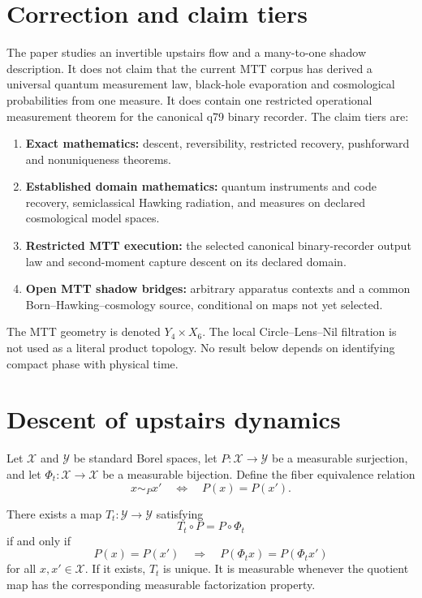 \documentclass[11pt]{article}
\newcommand{\cX}{\mathcal X}
\newcommand{\cY}{\mathcal Y}
\begin{document}
\tableofcontents

\section{Correction and claim tiers}

The paper studies an invertible upstairs flow and a many-to-one shadow description.
It does not claim that the current MTT corpus has derived a universal quantum
measurement law, black-hole evaporation and cosmological probabilities from one
measure. It does contain one restricted operational measurement theorem for the
canonical q79 binary recorder. The claim tiers are:
\begin{enumerate}
\item \textbf{Exact mathematics:} descent, reversibility, restricted recovery,
pushforward and nonuniqueness theorems.
\item \textbf{Established domain mathematics:} quantum instruments and code recovery,
semiclassical Hawking radiation, and measures on declared cosmological model spaces.
\item \textbf{Restricted MTT execution:} the selected canonical binary-recorder
output law and second-moment capture descent on its declared domain.
\item \textbf{Open MTT shadow bridges:} arbitrary apparatus contexts and a common
Born--Hawking--cosmology source, conditional on maps not yet selected.
\end{enumerate}

The MTT geometry is denoted $Y_4\times X_6$. The local Circle--Lens--Nil filtration
is not used as a literal product topology. No result below depends on identifying
compact phase with physical time.

\section{Descent of upstairs dynamics}

Let $\cX$ and $\cY$ be standard Borel spaces, let $P:\cX\to\cY$ be a measurable
surjection, and let $\Phi_t:\cX\to\cX$ be a measurable bijection. Define the fiber
equivalence relation
\[
 x\sim_P x'\quad\Longleftrightarrow\quad P(x)=P(x').
\]

\begin{theorem}\label{thm:descent}
There exists a map $T_t:\cY\to\cY$ satisfying
\begin{equation}
 T_t\circ P=P\circ\Phi_t
\label{eq:descent}
\end{equation}
if and only if
\begin{equation}
 P(x)=P(x')\quad\Longrightarrow\quad
 P(\Phi_t x)=P(\Phi_t x')
\label{eq:fiber}
\end{equation}
for all $x,x'\in\cX$. If it exists, $T_t$ is unique. It is measurable whenever
the quotient map has the corresponding measurable factorization property.
\end{theorem}
\end{document}
